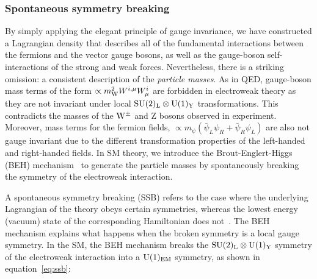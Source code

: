 

\FloatBarrier
\subsubsection{Spontaneous symmetry breaking}
By simply applying the elegant principle of gauge invariance, we have constructed a Lagrangian density that describes all of the fundamental interactions between the fermions and the vector gauge bosons, as well as the gauge-boson self-interactions of the strong and weak forces. Nevertheless, there is a striking omission: a consistent description of the \textit{particle masses}. As in QED, gauge-boson mass terms of the form $\propto m_{\rm{W}}^2W^{i,\mu}W^i_\mu$ are forbidden in electroweak theory as they are not invariant under local ${\rm{SU}(2)_{\rm{L}}}\otimes{\rm{U}}(1)_{\rm{Y}}$ transformations. This contradicts the masses of the ${\rm{W}}^{\pm}$ and Z bosons observed in experiment. Moreover, mass terms for the fermion fields, $\propto m_{\psi}(\bar{\psi}_L\psi_R+\bar{\psi}_R\psi_L)$ are also not gauge invariant due to the different transformation properties of the left-handed and right-handed fields. In SM theory, we introduce the Brout-Englert-Higgs (BEH) mechanism~\cite{Englert:1964et,HIGGS1964132,Higgs:1964pj,Guralnik:1964eu,PhysRev.145.1156,PhysRev.155.1554} to generate the particle masses by spontaneously breaking the symmetry of the electroweak interaction.

A spontaneous symmetry breaking (SSB) refers to the case where the underlying Lagrangian of the theory obeys certain symmetries, whereas the lowest energy (vacuum) state of the corresponding Hamiltonian does not~\cite{Aitchison:2004cs}. The BEH mechanism explains what happens when the broken symmetry is a local gauge symmetry. In the SM, the BEH mechanism breaks the ${\rm{SU}(2)_{\rm{L}}}\otimes{\rm{U}}(1)_{\rm{Y}}$ symmetry of the electroweak interaction into a ${\rm{U}}(1)_{\rm{EM}}$ symmetry, as shown in equation~\ref{eq:ssb}:

